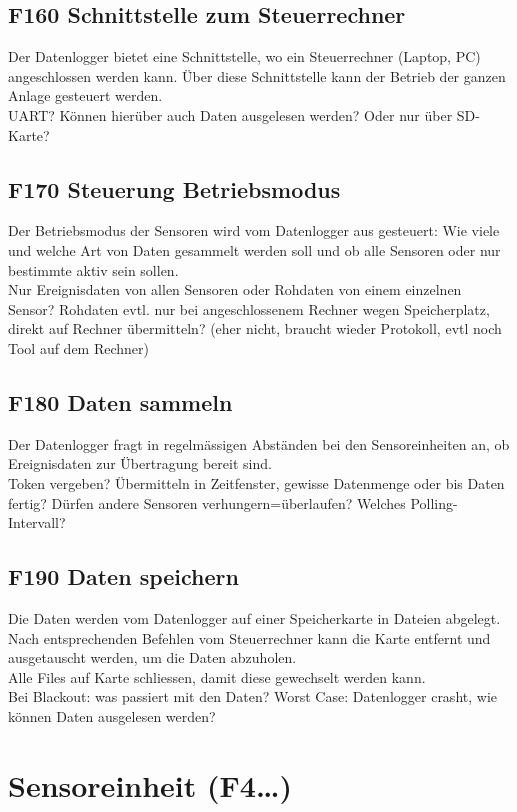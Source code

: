 \subsection{F160 Schnittstelle zum Steuerrechner}
Der Datenlogger bietet eine Schnittstelle, wo ein Steuerrechner (Laptop, PC) angeschlossen werden kann. Über diese Schnittstelle kann der Betrieb der ganzen Anlage gesteuert werden.\\
UART? Können hierüber auch Daten ausgelesen werden? Oder nur über SD-Karte?

\subsection{F170 Steuerung Betriebsmodus}
Der Betriebsmodus der Sensoren wird vom Datenlogger aus gesteuert: Wie viele und welche Art von Daten gesammelt werden soll und ob alle Sensoren oder nur bestimmte aktiv sein sollen. \\
Nur Ereignisdaten von allen Sensoren oder Rohdaten von einem einzelnen Sensor? Rohdaten evtl. nur bei angeschlossenem Rechner wegen Speicherplatz, direkt auf Rechner übermitteln? (eher nicht, braucht wieder Protokoll, evtl noch Tool auf dem Rechner)

\subsection{F180 Daten sammeln}
Der Datenlogger fragt in regelmässigen Abständen bei den Sensoreinheiten an, ob Ereignisdaten zur Übertragung bereit sind.\\
Token vergeben? Übermitteln in Zeitfenster, gewisse Datenmenge oder bis Daten fertig? Dürfen andere Sensoren verhungern=überlaufen? Welches Polling-Intervall?

\subsection{F190 Daten speichern}
Die Daten werden vom Datenlogger auf einer Speicherkarte in Dateien abgelegt. Nach entsprechenden Befehlen vom Steuerrechner kann die Karte entfernt und ausgetauscht werden, um die Daten abzuholen.\\
Alle Files auf Karte schliessen, damit diese gewechselt werden kann.\\
Bei Blackout: was passiert mit den Daten? Worst Case: Datenlogger crasht, wie können Daten ausgelesen werden?


\section{Sensoreinheit (F4\ldots)}

